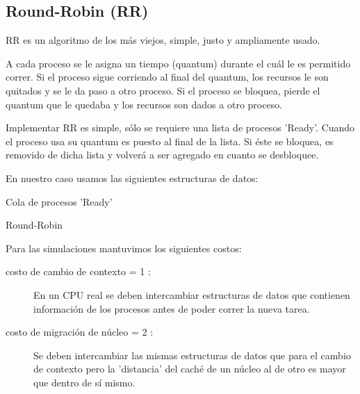 \subsection{Round-Robin (RR)}
RR es un algoritmo de los más viejos, simple, justo y ampliamente usado.

A cada proceso se le asigna un tiempo (quantum) durante el cuál le es permitido correr.
Si el proceso sigue corriendo al final del quantum, los recursos le son quitados y se le da paso a otro proceso.
Si el proceso se bloquea, pierde el quantum que le quedaba y los recursos son dados a otro proceso.

Implementar RR es simple, sólo se requiere una lista de procesos 'Ready'.
Cuando el proceso usa su quantum es puesto al final de la lista. 
Si éste se bloquea, es removido de dicha lista y volverá a ser agregado en cuanto se desbloquee.

En nuestro caso usamos las siguientes estructuras de datos:
 \begin{description}
  \item[Cola de procesos 'Ready']{}
 \end{description}

\begin{algorithm}
 \caption{Round-Robin}
 \begin{algorithmic}[1] 
 \EndProcedure


 \EndProcedure


   \Else
	 \EndIf	    
      \EndIf
   \EndIf
 \EndProcedure

 
    \EndIf
 \EndProcedure
 \end{algorithmic}
\end{algorithm}

Para las simulaciones mantuvimos los siguientes costos:
\begin{description}
 \item[costo de cambio de contexto = 1 :]{En un CPU real se deben intercambiar estructuras de datos que contienen información de los procesos antes de poder correr la nueva tarea.}
 \item[costo de migración de núcleo = 2 :]{Se deben intercambiar las mismas estructuras de datos que para el cambio de contexto pero la 'distancia' del caché de un núcleo al de otro es mayor que dentro de sí mismo.}
\end{description}

